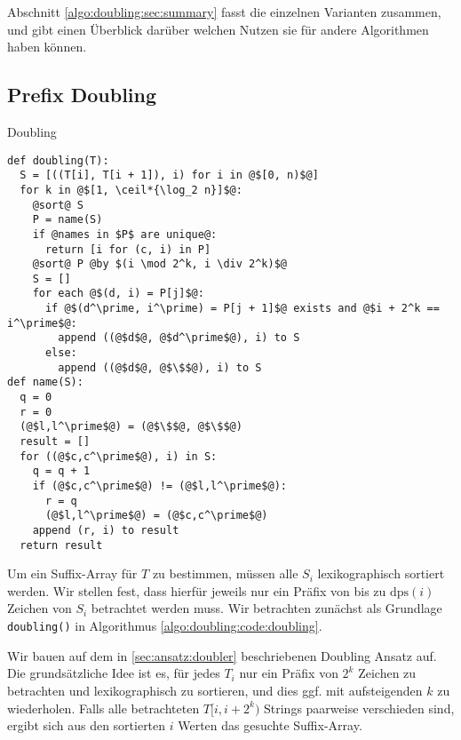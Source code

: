Abschnitt \ref{algo:doubling:sec:summary} fasst die einzelnen Varianten zusammen, und gibt einen Überblick darüber welchen Nutzen sie für andere Algorithmen haben können.

\subsection{Prefix Doubling}
\label{algo:doubling:sec:doubling}
\begin{listing}[htp]
\caption{Doubling} 
\label{algo:doubling:code:doubling}
\begin{verbatim}
def doubling(T):
  S = [((T[i], T[i + 1]), i) for i in @$[0, n)$@]
  for k in @$[1, \ceil*{\log_2 n}]$@:
    @sort@ S
    P = name(S)
    if @names in $P$ are unique@:
      return [i for (c, i) in P]
    @sort@ P @by $(i \mod 2^k, i \div 2^k)$@
    S = []
    for each @$(d, i) = P[j]$@:
      if @$(d^\prime, i^\prime) = P[j + 1]$@ exists and @$i + 2^k == i^\prime$@:
        append ((@$d$@, @$d^\prime$@), i) to S
      else:
        append ((@$d$@, @$\$$@), i) to S
def name(S):
  q = 0
  r = 0
  (@$l,l^\prime$@) = (@$\$$@, @$\$$@)
  result = []
  for ((@$c,c^\prime$@), i) in S:
    q = q + 1
    if (@$c,c^\prime$@) != (@$l,l^\prime$@):
      r = q
      (@$l,l^\prime$@) = (@$c,c^\prime$@)
    append (r, i) to result
  return result
\end{verbatim}
\end{listing}

Um ein Suffix-Array für $T$ zu bestimmen, müssen alle $S_i$ lexikographisch sortiert werden. Wir stellen fest, dass hierfür jeweils nur ein Präfix von bis zu $\text{dps}(i)$ Zeichen von $S_i$ betrachtet werden muss. Wir betrachten zunächst als Grundlage \texttt{doubling()} in Algorithmus \ref{algo:doubling:code:doubling}.

Wir bauen auf dem in \cref{sec:ansatz:doubler} beschriebenen Doubling Ansatz auf. Die grundsätzliche Idee ist es, für jedes $T_i$ nur ein Präfix von $2^k$ Zeichen zu betrachten und lexikographisch zu sortieren, und dies ggf. mit aufsteigenden $k$ zu wiederholen. Falls alle betrachteten $T[i, i + 2^k)$ Strings paarweise verschieden sind, ergibt sich aus den sortierten $i$ Werten das gesuchte Suffix-Array. 


